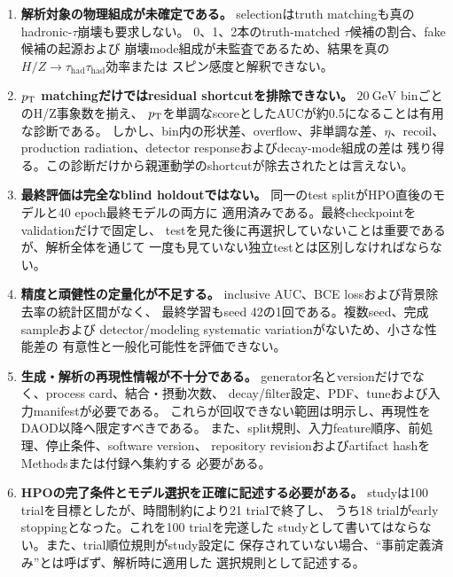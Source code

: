 \documentclass[xelatex,ja=standard,a4paper,10pt]{bxjsarticle}
\begin{document}
\begin{enumerate}
  \item \textbf{解析対象の物理組成が未確定である。}
    selectionはtruth matchingも真のhadronic-\(\tau\)崩壊も要求しない。
    0、1、2本のtruth-matched \(\tau\)候補の割合、fake候補の起源および
    崩壊mode組成が未監査であるため、結果を真の
    \(H/Z\rightarrow\tau_{\mathrm{had}}\tau_{\mathrm{had}}\)効率または
    スピン感度と解釈できない。

  \item \textbf{\(p_{\mathrm{T}}\) matchingだけではresidual shortcutを排除できない。}
    \(\SI{20}{\GeV}\) binごとのH/Z事象数を揃え、
    \(p_{\mathrm{T}}\)を単調なscoreとしたAUCが約0.5になることは有用な診断である。
    しかし、bin内の形状差、overflow、非単調な差、\(\eta\)、recoil、
    production radiation、detector responseおよびdecay-mode組成の差は
    残り得る。この診断だけから親運動学のshortcutが除去されたとは言えない。

  \item \textbf{最終評価は完全なblind holdoutではない。}
    同一のtest splitがHPO直後のモデルと40 epoch最終モデルの両方に
    適用済みである。最終checkpointをvalidationだけで固定し、
    testを見た後に再選択していないことは重要であるが、解析全体を通じて
    一度も見ていない独立testとは区別しなければならない。

  \item \textbf{精度と頑健性の定量化が不足する。}
    inclusive AUC、BCE lossおよび背景除去率の統計区間がなく、
    最終学習もseed 42の1回である。複数seed、完成sampleおよび
    detector/modeling systematic variationがないため、小さな性能差の
    有意性と一般化可能性を評価できない。

  \item \textbf{生成・解析の再現性情報が不十分である。}
    generator名とversionだけでなく、process card、結合・摂動次数、
    decay/filter設定、PDF、tuneおよび入力manifestが必要である。
    これらが回収できない範囲は明示し、再現性をDAOD以降へ限定すべきである。
    また、split規則、入力feature順序、前処理、停止条件、software version、
    repository revisionおよびartifact hashをMethodsまたは付録へ集約する
    必要がある。

  \item \textbf{HPOの完了条件とモデル選択を正確に記述する必要がある。}
    studyは100 trialを目標としたが、時間制約により21 trialで終了し、
    うち18 trialがearly stoppingとなった。これを100 trialを完遂した
    studyとして書いてはならない。また、trial順位規則がstudy設定に
    保存されていない場合、``事前定義済み''とは呼ばず、解析時に適用した
    選択規則として記述する。


\end{enumerate}
\end{document}
